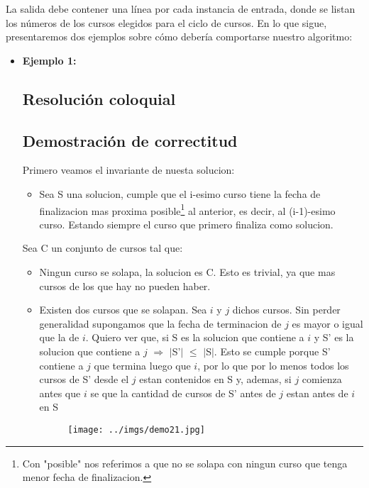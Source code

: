 La salida debe contener una línea por cada instancia de entrada, donde se listan los números de los cursos elegidos para el ciclo de cursos.\newline
\newline
En lo que sigue, presentaremos dos ejemplos sobre cómo debería comportarse nuestro algoritmo:
\begin{itemize}
\item {\large{\textbf{Ejemplo 1:}}}\newline
\subsection{Resolución coloquial}


\subsection{Demostración de correctitud}

Primero veamos el invariante de nuesta solucion:
\begin{itemize}
\item Sea S una solucion, cumple que el i-esimo curso tiene la fecha de finalizacion mas proxima posible\footnote{Con "posible" nos referimos a que no se solapa con ningun curso que tenga menor fecha de finalizacion.} al anterior, es decir, al (i-1)-esimo curso. Estando siempre el curso que primero finaliza como solucion.
\end{itemize}

Sea C un conjunto de cursos tal que:
\begin{itemize}
\item Ningun curso se solapa, la solucion es C. Esto es trivial, ya que mas cursos de los que hay no pueden  haber.
\item Existen dos cursos que se solapan. Sea $i$ y $j$ dichos cursos. Sin perder generalidad supongamos que la fecha de terminacion de $j$ es mayor o igual que la de $i$. Quiero ver que, si S es la solucion que contiene a $i$ y S' es la solucion que contiene a $j$ $\Rightarrow$ $|$S'$|$ $\leq$ $|$S$|$. 
  Esto se cumple porque S' contiene a $j$ que termina luego que $i$, por lo que por lo menos todos los cursos de S' desde el $j$ estan contenidos en S y, ademas, si  $j$ comienza antes que $i$ se que la cantidad de cursos de S' antes de $j$ estan antes de $i$ en S 

\begin{figure}[H] %
\begin{center}
\texttt{[image: ../imgs/demo21.jpg]}
\end{center}
\end{figure}


\end{itemize}
\end{itemize}
